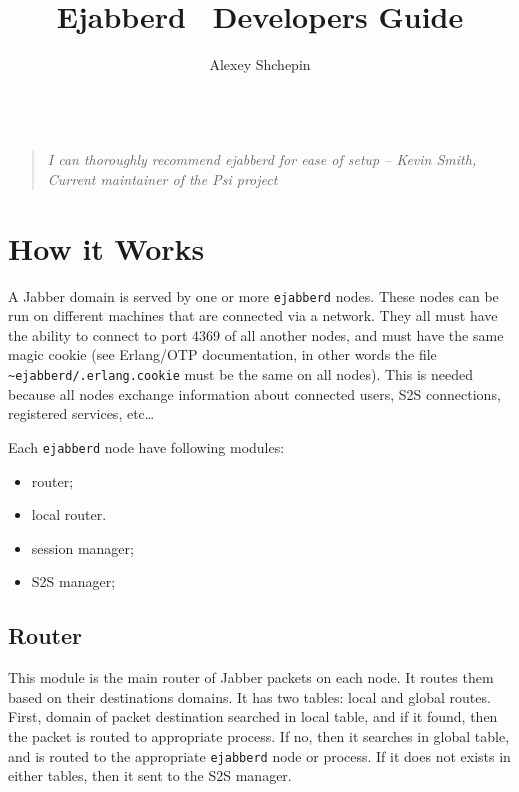 \documentclass[a4paper,10pt]{article}
\title{Ejabberd \version\ Developers Guide}
\author{Alexey Shchepin \\
  \ahrefurl{mailto:alexey@sevcom.net} \\
  \ahrefurl{xmpp:aleksey@jabber.ru}}
\newcommand{\logoscale}{0.7}
\newcommand{\insscaleimg}[2]{
  \imgsrc{#2}{}
  \begin{latexonly}
    \scalebox{#1}{\texttt{[image: \#2]}}
  \end{latexonly}
}
\newcommand{\ejabberd}{\texttt{ejabberd}}
\newcommand{\Jabber}{Jabber}
\begin{document}
\label{sec:titlepage}
\begin{titlepage}
  \maketitle{}

  \begin{center}
  {\insscaleimg{\logoscale}{logo.png}
    \par
  }
  \end{center}

  \begin{quotation}\textit{I can thoroughly recommend ejabberd for ease of setup --
  Kevin Smith, Current maintainer of the Psi project}\end{quotation}

\end{titlepage}

\tableofcontents{}



\section{How it Works}
\label{sec:howitworks}


A \Jabber{} domain is served by one or more \ejabberd{} nodes.  These nodes can
be run on different machines that are connected via a network.  They all must
have the ability to connect to port 4369 of all another nodes, and must have
the same magic cookie (see Erlang/OTP documentation, in other words the file
\texttt{\~{}ejabberd/.erlang.cookie} must be the same on all nodes). This is
needed because all nodes exchange information about connected users, S2S
connections, registered services, etc\ldots



Each \ejabberd{} node have following modules:
\begin{itemize}
\item router;
\item local router.
\item session manager;
\item S2S manager;
\end{itemize}


\subsection{Router}

This module is the main router of \Jabber{} packets on each node.  It routes
them based on their destinations domains.  It has two tables: local and global
routes.  First, domain of packet destination searched in local table, and if it
found, then the packet is routed to appropriate process.  If no, then it
searches in global table, and is routed to the appropriate \ejabberd{} node or
process.  If it does not exists in either tables, then it sent to the S2S
manager.
\end{document}
